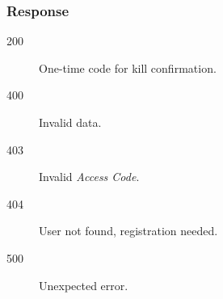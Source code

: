 \subsubsection*{Response}

\begin{description}

	\item[200] One-time code for kill confirmation.

	\item[400] Invalid data.

	\item[403] Invalid \textit{Access Code}.

	\item[404] User not found, registration needed.

	\item[500] Unexpected error.

\end{description}